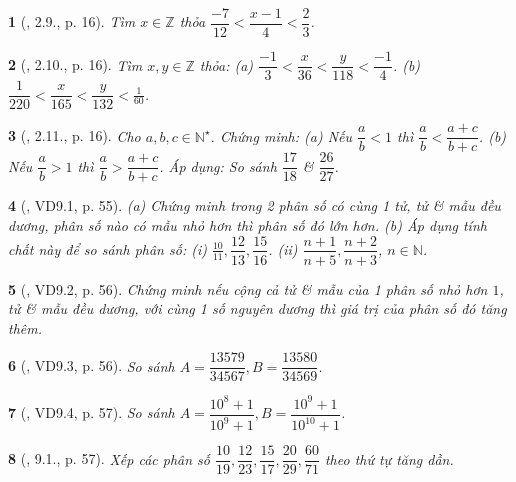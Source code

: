 \documentclass{article}
\newtheorem{baitoan}{}
\begin{document}
\begin{baitoan}[\cite{Binh_boi_duong_Toan_6_tap_2}, 2.9., p. 16]
	Tìm $x\in\mathbb{Z}$ thỏa $\dfrac{-7}{12} < \dfrac{x - 1}{4} < \dfrac{2}{3}$.
\end{baitoan}

\begin{baitoan}[\cite{Binh_boi_duong_Toan_6_tap_2}, 2.10., p. 16]
	Tìm $x,y\in\mathbb{Z}$ thỏa: (a) $\dfrac{-1}{3} < \dfrac{x}{36} < \dfrac{y}{118} < \dfrac{-1}{4}$. (b) $\dfrac{1}{220} < \dfrac{x}{165} < \dfrac{y}{132} < \frac{1}{60}$.
\end{baitoan}

\begin{baitoan}[\cite{Binh_boi_duong_Toan_6_tap_2}, 2.11., p. 16]
	Cho $a,b,c\in\mathbb{N}^\star$. Chứng minh: (a) Nếu $\dfrac{a}{b} < 1$ thì $\dfrac{a}{b} < \dfrac{a + c}{b + c}$. (b) Nếu $\dfrac{a}{b} > 1$ thì $\dfrac{a}{b} > \dfrac{a + c}{b + c}$. Áp dụng: So sánh $\dfrac{17}{18}$ \& $\dfrac{26}{27}$.
\end{baitoan}

\begin{baitoan}[\cite{TLCT_THCS_Toan_6_so_hoc}, VD9.1, p. 55]
	(a) Chứng minh trong 2 phân số có cùng 1 tử, tử \& mẫu đều dương, phân số nào có mẫu nhỏ hơn thì phân số đó lớn hơn. (b) Áp dụng tính chất này để so sánh phân số: (i) $\frac{10}{11},\dfrac{12}{13},\dfrac{15}{16}$. (ii) $\dfrac{n + 1}{n + 5},\dfrac{n + 2}{n + 3}$, $n\in\mathbb{N}$.
\end{baitoan}

\begin{baitoan}[\cite{TLCT_THCS_Toan_6_so_hoc}, VD9.2, p. 56]
	Chứng minh nếu cộng cả tử \& mẫu của 1 phân số nhỏ hơn $1$, tử \& mẫu đều dương, với cùng 1 số nguyên dương thì giá trị của phân số đó tăng thêm.
\end{baitoan}

\begin{baitoan}[\cite{TLCT_THCS_Toan_6_so_hoc}, VD9.3, p. 56]
	So sánh $A = \dfrac{13579}{34567},B = \dfrac{13580}{34569}$.
\end{baitoan}

\begin{baitoan}[\cite{TLCT_THCS_Toan_6_so_hoc}, VD9.4, p. 57]
	So sánh $A = \dfrac{10^8 + 1}{10^9 + 1},B = \dfrac{10^9 + 1}{10^{10} + 1}$.
\end{baitoan}

\begin{baitoan}[\cite{TLCT_THCS_Toan_6_so_hoc}, 9.1., p. 57]
	Xếp các phân số $\dfrac{10}{19},\dfrac{12}{23},\dfrac{15}{17},\dfrac{20}{29},\dfrac{60}{71}$ theo thứ tự tăng dần.
\end{baitoan}
\end{document}
